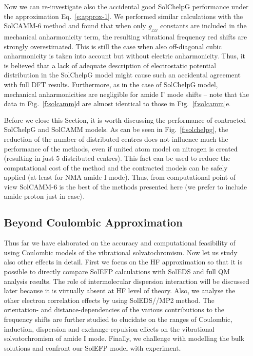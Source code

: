 \documentclass[b5paper,oneside,fleqn,11pt]{book}
\begin{document}
\begin{refsection}
Now we can re-investigate also the accidental good SolChelpG performance under the
approximation Eq.~\eqref{e:approx-1}. We performed similar 
calculations with the SolCAMM-6 method and found that when only $g_{jjj}$
constants are included in the mechanical anharmonicity term, 
the resulting vibrational frequency red shifts are strongly overestimated.
This is still the case when also off\hyp{}diagonal cubic anharmonicity
is taken into account but without electric anharmonicity.
Thus, it is believed that a lack of adequate description
of electrostatic potential distribution in the SolChelpG
model might cause such an accidental agreement with full DFT results. Furthermore,
as in the case of SolChelpG model, mechanical
anharmonicities are negligible for amide I' mode shifts -- note
that the data in Fig.~\ref{f:solcamm}d are almost identical to those in
Fig.~\ref{f:solcamm}e.

Before we close this Section, it is worth discussing 
the performance of contracted SolChelpG and
SolCAMM models. As can be seen in Fig.~\ref{f:solchelpg}, 
the reduction of the number of distributed centres
does not influence much the performance of the methods, even if united atom 
model on nitrogen is created (resulting in just 5 distributed centres). 
This fact can be used to reduce the computational cost of the method
and the contracted models can be safely applied (at least for NMA amide I mode).
Thus, from computational point of view SolCAMM-6 is the best of the methods
presented here (we prefer to include amide proton just in case).

\subsection{Beyond Coulombic Approximation}

Thus far we have elaborated on the accuracy and computational
feasibility of using Coulombic models of the vibrational solvatochromism.
Now let us study also other effects in detail.
First we focus on the HF approximation
so that it is possible to directly compare SolEFP calculations
with SolEDS and full QM analysis results. The role of intermolecular dispersion interaction
will be discussed later because it is virtually absent
at HF level of theory. Also, we analyse the other electron correlation
effects by using SolEDS//MP2 method. The orientation\hyp{}
and distance\hyp{}dependencies of the various contributions
to the frequency shifts are further studied to elucidate on
the ranges of Coulombic, induction, dispersion and exchange\hyp{}repulsion
effects on the vibrational solvatochromism of amide I mode.
Finally, we challenge with modelling the bulk solutions
and confront our SolEFP model with experiment.


\end{refsection}
\end{document}
